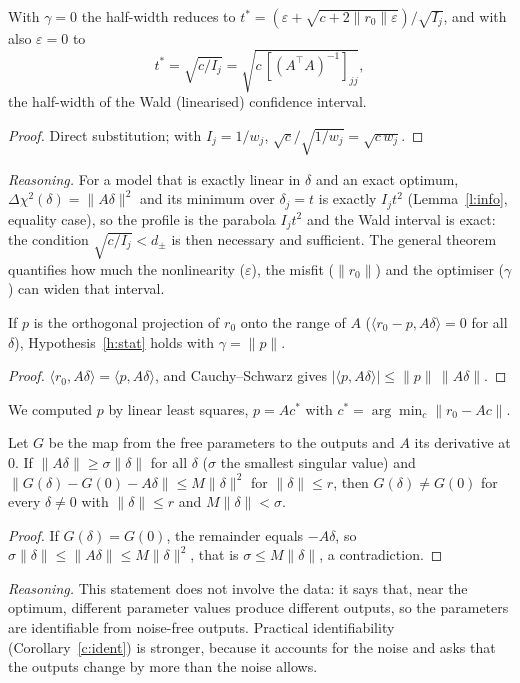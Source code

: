 \begin{sproposition}\label{p:wald}
With $\gamma=0$ the half-width reduces to $t^{\ast}=(\varepsilon+\sqrt{c+2\|r_0\|\varepsilon})/\sqrt{I_j}$, and with also $\varepsilon=0$ to
\[ t^{\ast}=\sqrt{c/I_j}=\sqrt{c\,[(A^{\top}A)^{-1}]_{jj}} , \]
the half-width of the Wald (linearised) confidence interval.
\end{sproposition}
\begin{proof}
Direct substitution; with $I_j=1/w_j$, $\sqrt{c}/\sqrt{1/w_j}=\sqrt{c\,w_j}$.
\end{proof}
\emph{Reasoning.} For a model that is exactly linear in $\delta$ and an exact optimum, $\Delta\chi^2(\delta)=\|A\delta\|^2$ and its minimum over $\delta_j=t$ is exactly $I_jt^2$ (Lemma~\ref{l:info}, equality case), so the profile is the parabola $I_jt^2$ and the Wald interval is exact: the condition $\sqrt{c/I_j}<d_\pm$ is then necessary and sufficient. The general theorem quantifies how much the nonlinearity ($\varepsilon$), the misfit ($\|r_0\|$) and the optimiser ($\gamma$) can widen that interval.

\begin{sproposition}\label{p:proj}
If $p$ is the orthogonal projection of $r_0$ onto the range of $A$ ($\langle r_0-p,A\delta\rangle=0$ for all $\delta$), Hypothesis~\ref{h:stat} holds with $\gamma=\|p\|$.
\end{sproposition}
\begin{proof}
$\langle r_0,A\delta\rangle=\langle p,A\delta\rangle$, and Cauchy--Schwarz gives $|\langle p,A\delta\rangle|\le\|p\|\,\|A\delta\|$.
\end{proof}
We computed $p$ by linear least squares, $p=Ac^{\ast}$ with $c^{\ast}=\arg\min_c\|r_0-Ac\|$.

\begin{sproposition}\label{p:local}
Let $G$ be the map from the free parameters to the outputs and $A$ its derivative at $0$. If $\|A\delta\|\ge\sigma\|\delta\|$ for all $\delta$ ($\sigma$ the smallest singular value) and $\|G(\delta)-G(0)-A\delta\|\le M\|\delta\|^2$ for $\|\delta\|\le r$, then $G(\delta)\ne G(0)$ for every $\delta\ne0$ with $\|\delta\|\le r$ and $M\|\delta\|<\sigma$.
\end{sproposition}
\begin{proof}
If $G(\delta)=G(0)$, the remainder equals $-A\delta$, so $\sigma\|\delta\|\le\|A\delta\|\le M\|\delta\|^2$, that is $\sigma\le M\|\delta\|$, a contradiction.
\end{proof}
\emph{Reasoning.} This statement does not involve the data: it says that, near the optimum, different parameter values produce different outputs, so the parameters are identifiable from noise-free outputs. Practical identifiability (Corollary~\ref{c:ident}) is stronger, because it accounts for the noise and asks that the outputs change by more than the noise allows.

